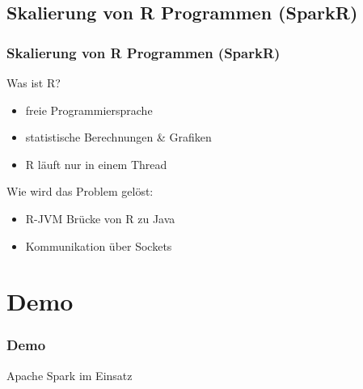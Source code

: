 \documentclass[hyperref={pdfpagelabels=false}]{beamer}
\begin{document}
\subsection{Skalierung von R Programmen (SparkR)}
\begin{frame} [t]
\frametitle{Skalierung von R Programmen (SparkR)}

	Was ist R?
	\begin{itemize}		
		\item freie Programmiersprache
		\item statistische Berechnungen \& Grafiken				
		\item R läuft nur in einem Thread
	\end{itemize}

Wie wird das Problem gelöst:
\begin{itemize}			
	\item R-JVM Brücke von R zu Java
	\item Kommunikation über Sockets 
\end{itemize}

 {
	\begin{figure}[h]
		\centering
	\end{figure}
}

\end{frame}



\section{Demo}
\begin{frame} [t]
\frametitle{Demo}

Apache Spark im Einsatz \\

\end{frame}
\end{document}
